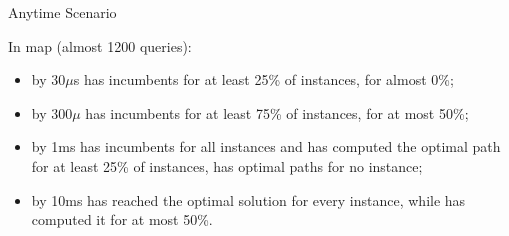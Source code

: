 \begin{frame}{Anytime Scenario}

    In  map (almost 1200 queries):

    \begin{itemize}
        \item by 30$\mu$s \anytimeCPDSearch{} has incumbents for at least 25\% of instances, \AWA{} for almost 0\%;
        \item by 300$\mu$ \anytimeCPDSearch{} has incumbents for at least 75\% of instances, \AWA{} for at most 50\%;
        \item by 1ms \anytimeCPDSearch{} has incumbents for all instances and has computed the optimal path for at least 25\% of instances, \AWA{} has optimal paths for no instance;
        \item by 10ms \anytimeCPDSearch{} has reached the optimal solution for every instance, while \AWA{} has computed it for at most 50\%.
    \end{itemize}
\end{frame}
